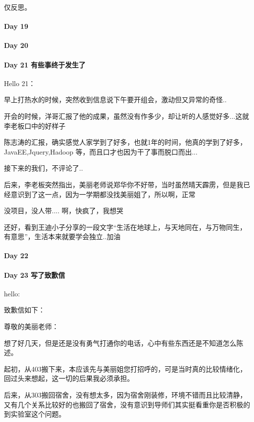 \documentclass[UTF8,a4paper,8pt]{ctexbook}
\begin{document}
	 	 仅反思。
 	 \paragraph{Day 19      \quad     }
 	 \paragraph{Day 20      \quad     }
 	 \paragraph{Day 21  有些事终于发生了    \quad     }
	 	 Hello 21：
	 	 
	 	 早上打热水的时候，突然收到信息说下午要开组会，激动但又异常的奇怪..
	 	 
	 	 开会的时候，洋哥汇报了他的成果，虽然没有作多少，却让听的人感觉好多...这就李老板口中的好样子
	 	 
	 	 陈志涛的汇报，确实感觉人家学到了好多，也就1年的时间，他真的学到了好多，JavaEE,Jquery,Hadoop 等，而且口才也因为干了事而脱口而出...
	 	 
	 	 接下来的我们，不评论了..
	 	 
	 	 后来，李老板突然指出，美丽老师说郑华你不好带，当时虽然晴天霹雳，但是我已经意识到了这一点，因为一学期都没找美丽姐了，所以啊，正常
	 	 
	 	 没项目，没人带.... 啊，快疯了，我想哭
	 	 
	 	 还好，看到王迪小子分享的一段文字“生活在地球上，与天地同在，与万物同生，有意思”，生活本来就要学会独立..加油
 	 \paragraph{Day 22      \quad     }
 	 \paragraph{Day 23  写了致歉信    \quad     }
	 	 hello:
	 	 
	 	 致歉信如下：
	 	 
	 	 尊敬的美丽老师：
	 	 
	 	 想了好几天，但是还是没有勇气打通你的电话，心中有些东西还是不知道怎么陈述。
	 	 
	 	 起初，从403搬下来，本应该先与美丽姐您打招呼的，可是当时真的比较情绪化，回过头来想起，这一切的后果我必须承担。
	 	 
	 	 后来，从303搬回宿舍，没有想太多，因为宿舍刚装修，环境不错而且比较清静，又有几个关系比较好的也搬回了宿舍，没有意识到导师们其实挺看重你是否积极的到实验室这个问题。
	 	 
\end{document}
